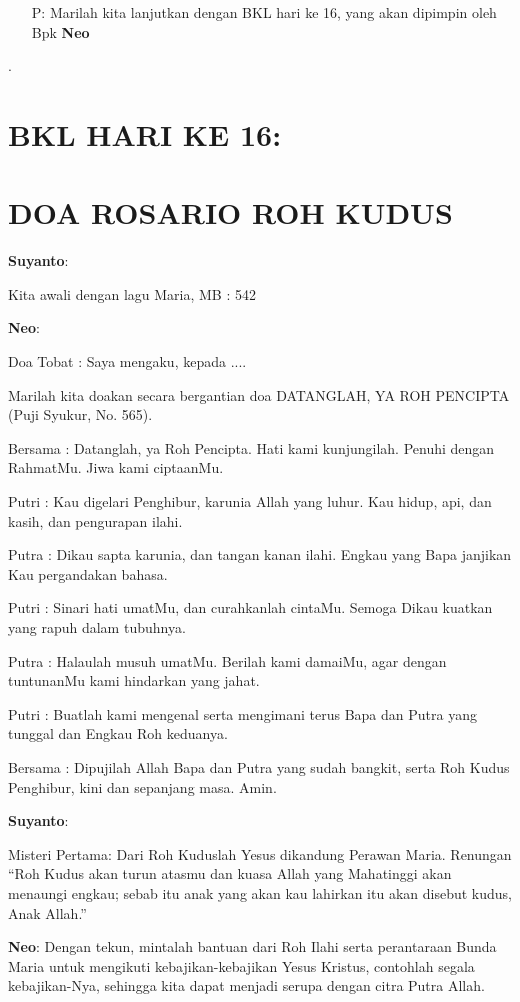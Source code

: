 \documentclass[12pt]{article}
\def\rosario{16}
\def\petugasA{\textbf{Suyanto}}
\def\petugasB{\textbf{Neo}}
\newcommand{\BP}[1]{\begin{itemize} \item[P:] #1 \end{itemize}}
\begin{document}
\BP{Marilah kita lanjutkan dengan BKL hari ke \rosario{}, yang akan dipimpin oleh Bpk \petugasB{}}.


\section*{BKL HARI KE \rosario{}: }

\section*{DOA ROSARIO ROH KUDUS}

\petugasA:

Kita awali dengan lagu Maria, MB : 542

\petugasB:

Doa Tobat : Saya mengaku, kepada ....

Marilah kita doakan secara bergantian  doa  DATANGLAH, YA ROH PENCIPTA
(Puji Syukur, No. 565).

Bersama : Datanglah, ya Roh Pencipta. Hati kami kunjungilah. Penuhi
dengan RahmatMu. Jiwa kami ciptaanMu. 

Putri : Kau digelari Penghibur, karunia Allah yang luhur. Kau hidup,
api, dan kasih, dan pengurapan ilahi. 

Putra : Dikau sapta karunia, dan tangan kanan ilahi. Engkau yang Bapa
janjikan Kau pergandakan bahasa.

Putri : Sinari hati umatMu, dan curahkanlah cintaMu. Semoga Dikau
kuatkan yang rapuh dalam tubuhnya.

Putra : Halaulah musuh umatMu. Berilah kami damaiMu, agar dengan
tuntunanMu kami hindarkan yang jahat. 

Putri : Buatlah kami mengenal serta mengimani terus Bapa dan Putra yang
tunggal dan Engkau Roh keduanya. 

Bersama : Dipujilah Allah Bapa dan Putra yang sudah bangkit, serta Roh
Kudus Penghibur, kini dan sepanjang masa. Amin. 

\petugasA:

Misteri Pertama: {\textquotedbl}Dari Roh Kuduslah Yesus dikandung
Perawan Maria.{\textquotedbl} Renungan  {\textquotedblleft}Roh Kudus
akan turun atasmu dan kuasa Allah yang Mahatinggi akan menaungi engkau;
sebab itu anak yang akan kau lahirkan itu akan disebut kudus, Anak
Allah.{\textquotedblright}

\petugasB: Dengan tekun, mintalah bantuan dari Roh Ilahi serta perantaraan
Bunda Maria untuk mengikuti kebajikan-kebajikan Yesus Kristus,
contohlah segala kebajikan-Nya, sehingga kita dapat menjadi serupa
dengan citra Putra Allah.
\end{document}

